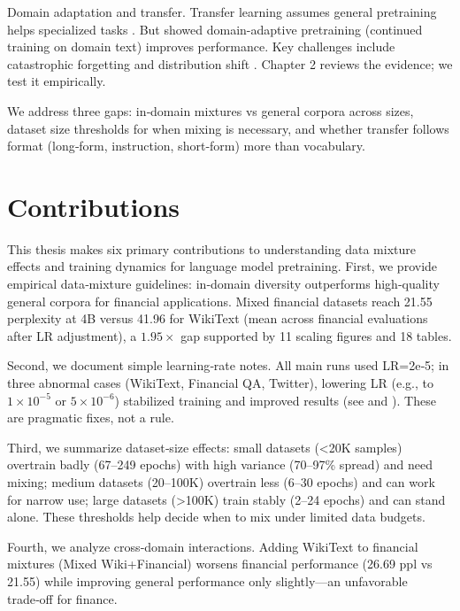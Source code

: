 Domain adaptation and transfer. Transfer learning assumes general pretraining helps specialized tasks \parencite{devlin2019bert, pan2010transfer}. But \textcite{gururangan2020don} showed domain-adaptive pretraining (continued training on domain text) improves performance. Key challenges include catastrophic forgetting \parencite{kirkpatrick2017overcoming} and distribution shift \parencite{quinonero2009dataset}. Chapter 2 reviews the evidence; we test it empirically.

We address three gaps: in‑domain mixtures vs general corpora across sizes, dataset size thresholds for when mixing is necessary, and whether transfer follows format (long‑form, instruction, short‑form) more than vocabulary.

\section{Contributions}

This thesis makes six primary contributions to understanding data mixture effects and training dynamics for language model pretraining. First, we provide empirical data‑mixture guidelines: in‑domain diversity outperforms high‑quality general corpora for financial applications. Mixed financial datasets reach 21.55 perplexity at 4B versus 41.96 for WikiText (mean across financial evaluations after LR adjustment), a $1.95\times$ gap supported by 11 scaling figures and 18 tables.

Second, we document simple learning‑rate notes. All main runs used LR=2e‑5; in three abnormal cases (WikiText, Financial QA, Twitter), lowering LR (e.g., to $1\times10^{-5}$ or $5\times10^{-6}$) stabilized training and improved results (see  and ). These are pragmatic fixes, not a rule.

Third, we summarize dataset‑size effects: small datasets (<20K samples) overtrain badly (67–249 epochs) with high variance (70–97\% spread) and need mixing; medium datasets (20–100K) overtrain less (6–30 epochs) and can work for narrow use; large datasets (>100K) train stably (2–24 epochs) and can stand alone. These thresholds help decide when to mix under limited data budgets.

Fourth, we analyze cross‑domain interactions. Adding WikiText to financial mixtures (Mixed Wiki+Financial) worsens financial performance (26.69 ppl vs 21.55) while improving general performance only slightly—an unfavorable trade‑off for finance.

